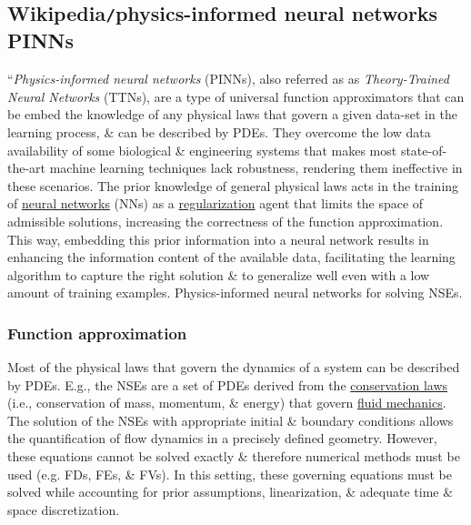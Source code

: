 \documentclass{article}
\begin{document}

\subsection{Wikipedia{\tt/}physics-informed neural networks PINNs}
``{\it Physics-informed neural networks} (PINNs), also referred as as {\it Theory-Trained Neural Networks} (TTNs), are a type of universal function approximators that can be embed the knowledge of any physical laws that govern a given data-set in the learning process, \& can be described by PDEs. They overcome the low data availability of some biological \& engineering systems that makes most state-of-the-art machine learning techniques lack robustness, rendering them ineffective in these scenarios. The prior knowledge of general physical laws acts in the training of \href{https://en.wikipedia.org/wiki/Neural_network}{neural networks} (NNs) as a \href{https://en.wikipedia.org/wiki/Regularization_(mathematics)}{regularization} agent that limits the space of admissible solutions, increasing the correctness of the function approximation. This way, embedding this prior information into a neural network results in enhancing the information content of the available data, facilitating the learning algorithm to capture the right solution \& to generalize well even with a low amount of training examples. {\sf Physics-informed neural networks for solving NSEs.}

\subsubsection{Function approximation}
Most of the physical laws that govern the dynamics of a system can be described by PDEs. E.g., the NSEs are a set of PDEs derived from the \href{https://en.wikipedia.org/wiki/Conservation_law}{conservation laws} (i.e., conservation of mass, momentum, \& energy) that govern \href{https://en.wikipedia.org/wiki/Fluid_mechanics}{fluid mechanics}. The solution of the NSEs with appropriate initial \& boundary conditions allows the quantification of flow dynamics in a precisely defined geometry. However, these equations cannot be solved exactly \& therefore numerical methods must be used (e.g. FDs, FEs, \& FVs). In this setting, these governing equations must be solved while accounting for prior assumptions, linearization, \& adequate time \& space discretization.
\end{document}
